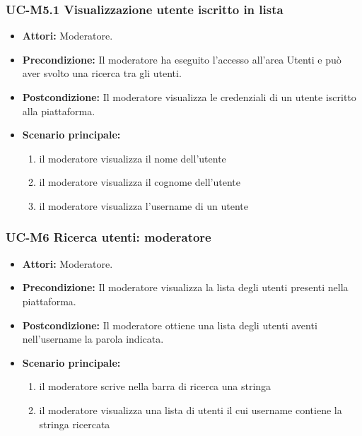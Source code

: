 \subsubsection{UC-M5.1 Visualizzazione utente iscritto in lista}
	\begin{itemize}
		\item \textbf{Attori:} Moderatore.
		\item \textbf{Precondizione:} Il moderatore ha eseguito l'accesso all'area Utenti e può aver svolto una ricerca tra gli utenti.
		\item \textbf{Postcondizione:} Il moderatore visualizza le credenziali di un utente iscritto alla piattaforma.
		\item \textbf{Scenario principale:}
			\begin{enumerate}
				\item il moderatore visualizza il nome dell'utente
				\item il moderatore visualizza il cognome dell'utente
				\item il moderatore visualizza l'username di un utente
			\end{enumerate}
	\end{itemize}
		
\subsubsection{UC-M6 Ricerca utenti: moderatore}
	\begin{itemize}
		\item \textbf{Attori:} Moderatore.
		\item \textbf{Precondizione:} Il moderatore visualizza la lista degli utenti presenti nella piattaforma.
		\item \textbf{Postcondizione:} Il moderatore ottiene una lista degli utenti aventi nell'username la parola indicata.
		\item \textbf{Scenario principale:}
			\begin{enumerate}
				\item il moderatore scrive nella barra di ricerca una stringa
				\item il moderatore visualizza una lista di utenti il cui username contiene la stringa ricercata
			\end{enumerate}
	\end{itemize}
	
